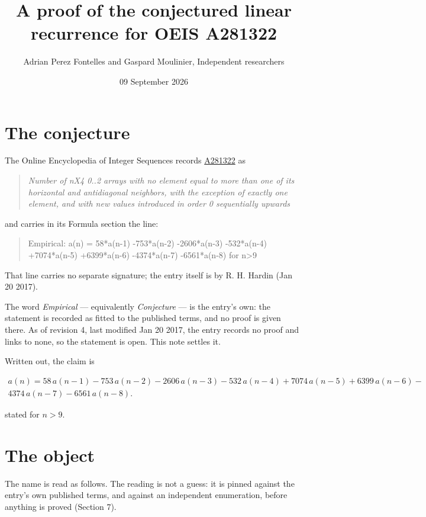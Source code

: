 \documentclass[11pt]{article}
\title{A proof of the conjectured linear recurrence for OEIS A281322}
\author{Adrian Perez Fontelles and Gaspard Moulinier, Independent researchers}
\date{09 September 2026}
\theoremstyle{definition}
\begin{document}
\maketitle
\section{The conjecture}

The Online Encyclopedia of Integer Sequences records \href{https://oeis.org/A281322}{A281322} as

\begin{quote}\itshape Number of nX4 0..2 arrays with no element equal to more than one of its horizontal and antidiagonal neighbors, with the exception of exactly one element, and with new values introduced in order 0 sequentially upwards\end{quote}

and carries in its Formula section the line:

\begin{quote}\ttfamily Empirical: a(n) = 58*a(n-1) -753*a(n-2) -2606*a(n-3) -532*a(n-4) +7074*a(n-5) +6399*a(n-6) -4374*a(n-7) -6561*a(n-8) for n>9\end{quote}

That line carries no separate signature; the entry itself is by R. H. Hardin (Jan 20 2017).

The word {\itshape Empirical} --- equivalently {\itshape Conjecture} --- is the entry's own: the statement is recorded as fitted to the published terms, and no proof is given there. As of revision 4, last modified Jan 20 2017, the entry records no proof and links to none, so the statement is open. This note settles it.

Written out, the claim is

\begin{multline*} a(n) = 58\,a(n-1) - 753\,a(n-2) - 2606\,a(n-3) - 532\,a(n-4) + 7074\,a(n-5) + 6399\,a(n-6) - \\ 4374\,a(n-7) - 6561\,a(n-8). \end{multline*}

stated for $n > 9$.

\section{The object}

The name is read as follows. The reading is not a guess: it is pinned against the entry's own published terms, and against an independent enumeration, before anything is proved (Section 7).
\end{document}
